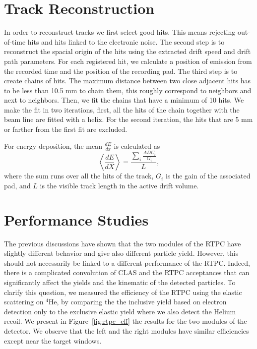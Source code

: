 \documentclass[twocolumn,showpacs,superscriptaddress,groupedaddress]{revtex4}
\begin{document}
\section{Track Reconstruction}\label{sec_rec}
In order to reconstruct tracks we first select good hits. This means rejecting 
out-of-time hits and hits linked to the electronic noise. The second step is 
to reconstruct the spacial origin of the hits using the extracted drift speed and drift path 
parameters. For each registered hit, we calculate a position of emission from 
the recorded time and the position of the recording pad. The third step 
is to create chains of hits. The maximum distance between two close adjacent 
hits has to be less than 10.5 mm to chain them, this roughly correspond to 
neighbors and next to neighbors. Then, we fit the chains that have a minimum of 
10 hits. We make the fit in two iterations, first, all the hits of the chain 
together with the beam line are fitted with a helix. For the second iteration, 
the hits that are 5 mm or farther from the first fit are excluded.

For energy deposition, the mean $\frac{dE}{dx}$ is calculated as
\begin{equation}
 \left\langle \frac{dE}{dX} \right\rangle= \frac{\sum\limits_{i} \frac{ADC_{i}}{G_i}}{L},
\end{equation}
where the sum runs over all the hits of the track, $G_{i}$ is the gain of 
the associated pad, and $L$ is the visible track length in the active drift 
volume. 

\section{Performance Studies}\label{sec_perfor}

The previous discussions have shown that the two modules of the RTPC have 
slightly different behavior and give also different particle yield. However, 
this should not necessarily be linked to a different performance of the RTPC. 
Indeed, there is a complicated convolution of CLAS and the RTPC acceptances 
that can significantly affect the yields and the kinematic of the detected 
particles. To clarify this question, we measured the 
efficiency of the RTPC using the elastic scattering on $^4$He, by comparing the 
 the inclusive yield based on electron detection only to the exclusive elastic 
yield where we also detect the Helium recoil. We present in 
Figure~\ref{fig:rtpc_eff} the results for the two modules 
of the detector. We observe that the left and 
the right modules have similar efficiencies except near the target windows.
\end{document}
